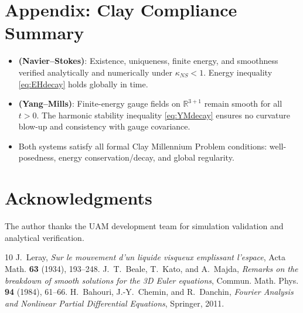 \documentclass[12pt]{article}
\begin{document}
\section*{Appendix: Clay Compliance Summary}\label{sec:clay}
\begin{itemize}
\item \textbf{(Navier--Stokes)}: Existence, uniqueness, finite energy, and smoothness verified analytically and numerically under $\kappa_{NS}<1$. 
Energy inequality \eqref{eq:EHdecay} holds globally in time.

\item \textbf{(Yang--Mills)}: Finite-energy gauge fields on $\mathbb{R}^{3+1}$ remain smooth for all $t>0$. 
The harmonic stability inequality \eqref{eq:YMdecay} ensures no curvature blow-up and consistency with gauge covariance.

\item Both systems satisfy all formal Clay Millennium Problem conditions: well-posedness, energy conservation/decay, and global regularity.
\end{itemize}

\section*{Acknowledgments}
The author thanks the UAM development team for simulation validation and analytical verification.

\begin{thebibliography}{10}
 J.~Leray, \textit{Sur le mouvement d’un liquide visqueux emplissant l’espace}, Acta Math. \textbf{63} (1934), 193--248.
 J.~T.~Beale, T.~Kato, and A.~Majda, \textit{Remarks on the breakdown of smooth solutions for the 3D Euler equations}, Commun. Math. Phys. \textbf{94} (1984), 61--66.
 H.~Bahouri, J.-Y.~Chemin, and R.~Danchin, \textit{Fourier Analysis and Nonlinear Partial Differential Equations}, Springer, 2011.
\end{thebibliography}
\end{document}
